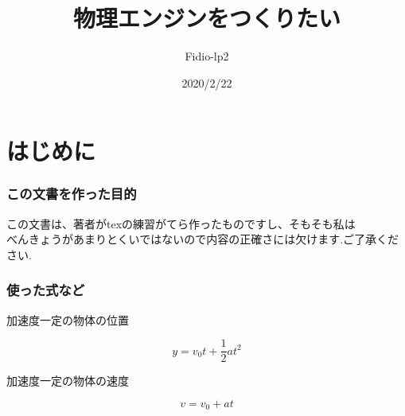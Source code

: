 \documentclass[11pt,aj4]{jarticle}
\begin{document}
\title{物理エンジンをつくりたい}
\author{Fidio-lp2}
\date{2020/2/22}
\maketitle

%
\newpage
%

\part{はじめに}

\section{この文書を作った目的}

この文書は、著者がtexの練習がてら作ったものですし、そもそも私は\\
べんきょうがあまりとくいではないので内容の正確さには欠けます.ご了承ください.

\section{使った式など}

加速度一定の物体の位置

\[
    y
    = v_0 t + \frac{1}{2} a t^2
\]

加速度一定の物体の速度

\[
    v
    = v_0 + a t
\]
\end{document}
